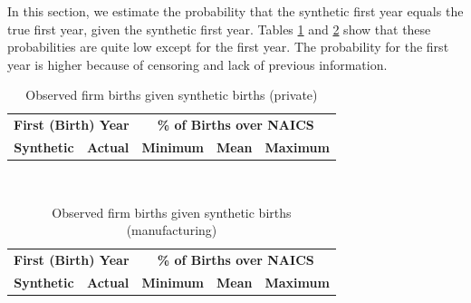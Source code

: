 
In this section, we estimate the probability that the synthetic first year equals the true first year, given the synthetic first year.  Tables \ref{ProbabilityPrivate} and \ref{ProbabilityManufacturing} show that these probabilities are quite low except for the first year.  The probability for the first year is higher because of censoring and lack of previous information.

\begin{table}[H]
\centering\footnotesize
\caption{Observed firm births given synthetic births (private)} \label{ProbabilityPrivate} \medskip
\renewcommand{\arraystretch}{1}
\begin{tabular}{c c| c c c}
\toprule
\multicolumn{2}{c|}{\textbf{First (Birth) Year}} &  \multicolumn{3}{c}{\textbf{\% of Births over NAICS}}\\
\textbf{Synthetic}&\textbf{Actual}&\textbf{Minimum}&\textbf{Mean}&\textbf{Maximum}\\
\midrule

\bottomrule
\end{tabular} 
\\
\justify
\end{table}

\begin{table}[H]
\centering\footnotesize
\caption{Observed firm births given synthetic births (manufacturing)} \label{ProbabilityManufacturing} \medskip
\renewcommand{\arraystretch}{1}
\begin{tabular}{c c| c c c}
\toprule
\multicolumn{2}{c|}{\textbf{First (Birth) Year}} &  \multicolumn{3}{c}{\textbf{\% of Births over NAICS}}\\
\textbf{Synthetic}&\textbf{Actual}&\textbf{Minimum}&\textbf{Mean}&\textbf{Maximum}\\
\midrule

\bottomrule
\end{tabular} 
\\
\justify
\end{table}

